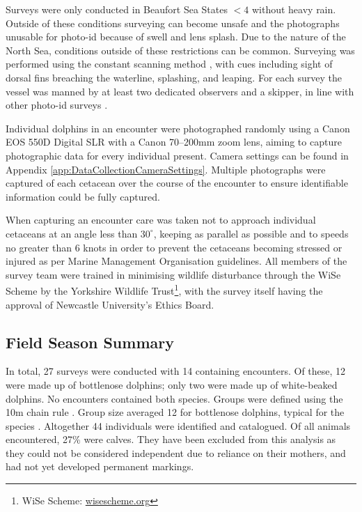 Surveys were only conducted in Beaufort Sea States $<4$ \cite{world_meteorologicial_society_beaufort_1970} without heavy rain. Outside of these conditions surveying can become unsafe and the photographs unusable for photo-id because of swell and lens splash. Due to the nature of the North Sea, conditions outside of these restrictions can be common. Surveying was performed using the constant scanning method \cite{mann_behavioral_1999}, with cues including sight of dorsal fins breaching the waterline, splashing, and leaping. For each survey the vessel was manned by at least two dedicated observers and a skipper, in line with other photo-id surveys \cite{sharpe_indian_2019, bessesen_lacaziosis-like_2014, silva_winter_2012}.

Individual dolphins in an encounter were photographed randomly using a Canon EOS 550D Digital SLR with a Canon 70–200mm zoom lens, aiming to capture photographic data for every individual present. Camera settings can be found in Appendix \ref{app:DataCollectionCameraSettings}. Multiple photographs were captured of each cetacean over the course of the encounter to ensure identifiable information could be fully captured. 

When capturing an encounter care was taken not to approach individual cetaceans at an angle less than $30^{\circ}$, keeping as parallel as possible and to speeds no greater than 6 knots in order to prevent the cetaceans becoming stressed or injured as per Marine Management Organisation guidelines. All members of the survey team were trained in minimising wildlife disturbance through the WiSe Scheme by the Yorkshire Wildlife Trust\footnote{WiSe Scheme: \href{https://www.wisescheme.org/}{wisescheme.org}}, with the survey itself having the approval of Newcastle University's Ethics Board.

\subsection{Field Season Summary}\label{ch:datasetCreation,sec:NDD,sub:FieldSeasonSummary}

In total, 27 surveys were conducted with 14 containing encounters. Of these, 12 were made up of bottlenose dolphins; only two were made up of white-beaked dolphins. No encounters contained both species. Groups were defined using the 10m chain rule \cite{smolker_sex_1992}. Group size averaged 12 for bottlenose dolphins, typical for the species \cite{shane_ecology_1986}. Altogether 44 individuals were identified and catalogued. Of all animals encountered, 27\% were calves. They have been excluded from this analysis as they could not be considered independent due to reliance on their mothers, and had not yet developed permanent markings.

